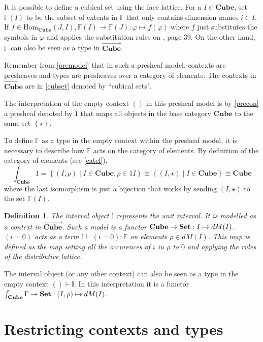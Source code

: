 \documentclass[12pt,a4paper,twoside,xetex]{book} %
\newcommand{\keyword}[1]{\emph{#1}\index{#1}}
\newtheorem{definition}[theorem]{Definition}
\newcommand{\psh}[1]{\overrightarrow{#1}}
\newcommand{\singleton}[0]{\left\{ \star \right\}}
\newcommand{\homo}[3]{\text{Hom}_{#1}\left(#2,#3\right)}
\newcommand{\cube}[0]{\textbf{Cube}}
\begin{document}
It is possible to define a cubical set using the face lattice. For a $I\in 
\cube$, set $\mathbb{F}(I)$ to be the subset of extents in 
$\mathbb{F}$ that only contains dimension names $i \in I$. If $f \in 
\homo{\cube}{J}{I}, \mathbb{F}(I) \rightarrow \mathbb{F}(J): \varphi 
\mapsto f(\varphi)$ where $f$ just substitutes the symbols in $\varphi$ and 
applies the substitution rules on \cite{Orton2019}, page 39. On the other hand, 
$\mathbb{F}$ can also be seen as a type in $\psh{\cube}$. 

Remember from \cref{premodel} that in such a presheaf model, contexts are 
presheaves and types are presheaves over a category of elements. The contexts 
in $\psh{\cube}$ are in \cref{cubset} 
denoted by ``cubical sets".

The interpretation of the empty context $()$ in this presheaf model is by 
\cref{precon} a presheaf denoted by $1$ that maps all objects in the base 
category $\cube$ to the same set $\singleton$. 

To define $\mathbb{F}$ as a type in the empty context within the presheaf 
model, it is necessary to describe how $\mathbb{F}$ acts on the category of 
elements. By definition of the category of elements (see \cref{catel}), 
$$\int_{\cube} 1 = \left\{ (I, \rho ) \mid I \in \cube, \rho \in 1I 
\right\} \cong \left\{ (I, \star ) \mid I \in \cube \right\}  \cong 
\cube$$ where the last isomorphism is just a bijection that works by 
sending $(I, \star )$ to the set $\mathbb{F}(I)$.


\begin{definition}\label{interval}
The \keyword{interval object} $\mathbb{I}$ represents the unit interval. It is 
modelled as a context in $\psh{\cube}$. Such a model is a functor 
$\cube \rightarrow \set : I \mapsto dM(I)$.  $(i=0)$ acts as a term 
$\mathbb{I} \vdash (i = 0) : \mathbb{F}$ on elements $\rho \in dM (I)$. This 
map is defined as the map setting all the occurences of $i$ in $\rho$ to $0$ 
and applying the rules of the distributive lattice.
\end{definition}

The interval object (or any other context) can also be seen as a type in the empty context $() \vdash \mathbb{I}$. In this interpretation it is a functor  $\int_{\cube} \Gamma \rightarrow 
\set : (I,\rho) \mapsto dM(I)$.



\section{Restricting contexts and types}
\end{document}
